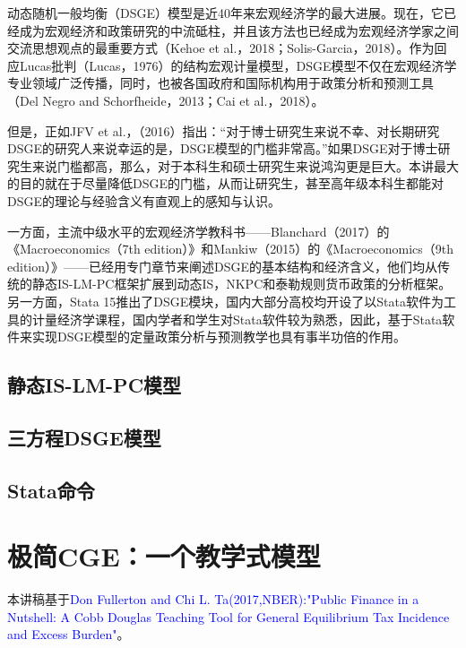 \documentclass[cn,10pt,math=newtx,citestyle=gb7714-2015,bibstyle=gb7714-2015]{elegantbook}
\begin{document}
	动态随机一般均衡（DSGE）模型是近40年来宏观经济学的最大进展。现在，它已经成为宏观经济和政策研究的中流砥柱，并且该方法也已经成为宏观经济学家之间交流思想观点的最重要方式（Kehoe et al.，2018；Solis-Garcia，2018）。作为回应Lucas批判（Lucas，1976）的结构宏观计量模型，DSGE模型不仅在宏观经济学专业领域广泛传播，同时，也被各国政府和国际机构用于政策分析和预测工具（Del Negro and Schorfheide，2013；Cai et al.，2018）。
	
	但是，正如JFV et al.，（2016）指出：“对于博士研究生来说不幸、对长期研究DSGE的研究人来说幸运的是，DSGE模型的门槛非常高。”如果DSGE对于博士研究生来说门槛都高，那么，对于本科生和硕士研究生来说鸿沟更是巨大。本讲最大的目的就在于尽量降低DSGE的门槛，从而让研究生，甚至高年级本科生都能对DSGE的理论与经验含义有直观上的感知与认识。
	
	一方面，主流中级水平的宏观经济学教科书——Blanchard（2017）的《Macroeconomics（7th edition）》和Mankiw（2015）的《Macroeconomics（9th edition）》——已经用专门章节来阐述DSGE的基本结构和经济含义，他们均从传统的静态IS-LM-PC框架扩展到动态IS，NKPC和泰勒规则货币政策的分析框架。另一方面，Stata 15推出了DSGE模块，国内大部分高校均开设了以Stata软件为工具的计量经济学课程，国内学者和学生对Stata软件较为熟悉，因此，基于Stata软件来实现DSGE模型的定量政策分析与预测教学也具有事半功倍的作用。
	
	\section{静态IS-LM-PC模型}
	
	
	\section{三方程DSGE模型}
	
	
	\section{Stata命令}
	
	
	
	\chapter{极简CGE：一个教学式模型}
	
	
	
		本讲稿基于\textcolor{blue}{Don Fullerton and Chi L. Ta(2017,NBER):"Public Finance in a Nutshell: A Cobb Douglas Teaching Tool for General Equilibrium Tax Incidence and Excess Burden"}。
	
	
	
\end{document}
